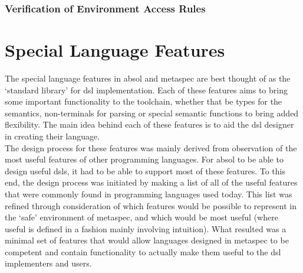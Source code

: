 
\subsubsection{Verification of Environment Access Rules} %
\label{ssub:verification_of_environment_access_rules}




\section{Special Language Features} %
\label{sec:special_language_features}

The special language features in \gls{absol} and \gls{metaspec} are best thought of as the `standard library' for \gls{dsl} implementation.
Each of these features aims to bring some important functionality to the toolchain, whether that be types for the semantics, non-terminals for parsing or special semantic functions to bring added flexibility. 
The main idea behind each of these features is to aid the \gls{dsl} designer in creating their language. \\

The design process for these features was mainly derived from observation of the most useful features of other programming languages.
For \gls{absol} to be able to design useful \glspl{dsl}, it had to be able to support most of these features. 
To this end, the design process was initiated by making a list of all of the useful features that were commonly found in programming languages used today.
This list was refined through consideration of which features would be possible to represent in the `safe' environment of \gls{metaspec}, and which would be most useful (where useful is defined in a fashion mainly involving intuition).
What resulted was a minimal set of features that would allow languages designed in \gls{metaspec} to be competent and contain functionality to actually make them useful to the \gls{dsl} implementers and users. 

